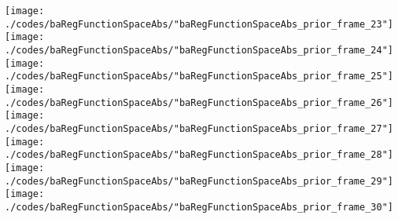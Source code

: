 \begin{frame}{\insertsection}
\begin{center}
{\begin{animateinline}{15}
				 \texttt{[image: ./codes/baRegFunctionSpaceAbs/"baRegFunctionSpaceAbs\_prior\_frame\_23"]}\newframe
				 \texttt{[image: ./codes/baRegFunctionSpaceAbs/"baRegFunctionSpaceAbs\_prior\_frame\_24"]}\newframe
				 \texttt{[image: ./codes/baRegFunctionSpaceAbs/"baRegFunctionSpaceAbs\_prior\_frame\_25"]}\newframe
				 \texttt{[image: ./codes/baRegFunctionSpaceAbs/"baRegFunctionSpaceAbs\_prior\_frame\_26"]}\newframe
				 \texttt{[image: ./codes/baRegFunctionSpaceAbs/"baRegFunctionSpaceAbs\_prior\_frame\_27"]}\newframe
				 \texttt{[image: ./codes/baRegFunctionSpaceAbs/"baRegFunctionSpaceAbs\_prior\_frame\_28"]}\newframe
				 \texttt{[image: ./codes/baRegFunctionSpaceAbs/"baRegFunctionSpaceAbs\_prior\_frame\_29"]}\newframe
				 \texttt{[image: ./codes/baRegFunctionSpaceAbs/"baRegFunctionSpaceAbs\_prior\_frame\_30"]}
			 \end{animateinline}
			}
	\end{center}
    
\end{frame}

